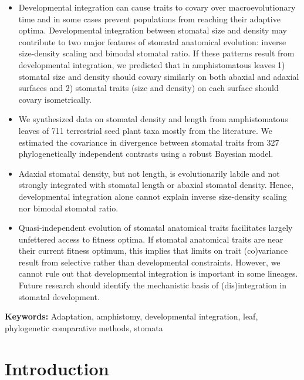 \documentclass[
  10pt,
]{article}
\providecommand{\tightlist}{%
  \setlength{\itemsep}{0pt}\setlength{\parskip}{0pt}}
\begin{document}
\begin{itemize}
\tightlist
\item
  Developmental integration can cause traits to covary over macroevolutionary time and in some cases prevent populations from reaching their adaptive optima. Developmental integration between stomatal size and density may contribute to two major features of stomatal anatomical evolution: inverse size-density scaling and bimodal stomatal ratio. If these patterns result from developmental integration, we predicted that in amphistomatous leaves 1) stomatal size and density should covary similarly on both abaxial and adaxial surfaces and 2) stomatal traits (size and density) on each surface should covary isometrically.
\item
  We synthesized data on stomatal density and length from amphistomatous leaves of 711 terrestrial seed plant taxa mostly from the literature. We estimated the covariance in divergence between stomatal traits from 327 phylogenetically independent contrasts using a robust Bayesian model.
\item
  Adaxial stomatal density, but not length, is evolutionarily labile and not strongly integrated with stomatal length or abaxial stomatal density. Hence, developmental integration alone cannot explain inverse size-density scaling nor bimodal stomatal ratio.
\item
  Quasi-independent evolution of stomatal anatomical traits facilitates largely unfettered access to fitness optima. If stomatal anatomical traits are near their current fitness optimum, this implies that limits on trait (co)variance result from selective rather than developmental constraints. However, we cannot rule out that developmental integration is important in some lineages. Future research should identify the mechanistic basis of (dis)integration in stomatal development.
\end{itemize}

\textbf{Keywords:} Adaptation, amphistomy, developmental integration, leaf, phylogenetic comparative methods, stomata

\linenumbers

\hypertarget{introduction}{%
\section{Introduction}\label{introduction}}
\end{document}
